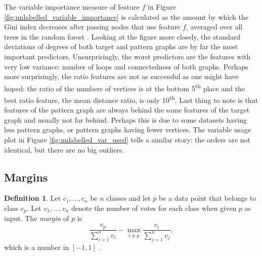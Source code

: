 \documentclass{l4proj}
\theoremstyle{definition}
\newtheorem{definition}{Definition}[chapter]
\theoremstyle{remark}
\begin{document}
The variable importance measure of feature $f$ in Figure
\ref{fig:unlabelled_variable_importance} is calculated as the amount by which
the Gini index decreases after passing nodes that use feature $f$, averaged over
all trees in the random forest \cite{James:2014:ISL:2517747}. Looking at the
figure more closely, the standard deviations of degrees of both target and
pattern graphs are by far the most important predictors. Unsurprisingly, the
worst predictors are the features with very low variance: number of loops and
connectedness of both graphs. Perhaps more surprisingly, the ratio features are
not as successful as one might have hoped: the ratio of the numbers of vertices
is at the bottom 5\textsuperscript{th} place and the best ratio feature, the
mean distance ratio, is only 10\textsuperscript{th}. Last thing to note is that
features of the pattern graph are always behind the same features of the target
graph and usually not far behind. Perhaps this is due to some datasets having
less pattern graphs, or pattern graphs having fewer vertices. The variable usage
plot in Figure \ref{fig:unlabelled_var_used} tells a similar story: the orders
are not identical, but there are no big outliers.

\subsection{Margins}

\begin{definition}
  Let $c_1, \dots, c_n$ be $n$ classes and let $p$ be a data point that belongs
  to class $c_p$. Let $v_1, \dots, v_n$ denote the number of votes for each
  class when given $p$ as input. The \emph{margin} of $p$ is
  \[ \frac{v_p}{\sum_{i=1}^n v_i} - \max_{i \ne p} \frac{v_i}{\sum_{j=1}^n v_j}, \]
  which is a number in $[-1, 1]$ \cite{forest}.
\end{definition}
\end{document}
